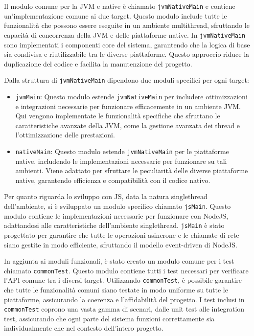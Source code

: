 \documentclass[12pt,a4paper,openright,twoside]{book}
\begin{document}
Il modulo comune per la \ac{JVM} e native è chiamato \texttt{jvmNativeMain} e contiene 
un'implementazione comune ai due target. Questo modulo include tutte le funzionalità che possono essere eseguite in un ambiente multithread, 
sfruttando le capacità di concorrenza della \ac{JVM} e delle piattaforme native. In \texttt{jvmNativeMain} sono implementati i componenti core del sistema, 
garantendo che la logica di base sia condivisa e riutilizzabile tra le diverse piattaforme. Questo approccio riduce la duplicazione 
del codice e facilita la manutenzione del progetto.

Dalla struttura di \texttt{jvmNativeMain} dipendono due moduli specifici per ogni target:
\begin{itemize}
    \item \texttt{jvmMain}: Questo modulo estende \texttt{jvmNativeMain} per includere ottimizzazioni e integrazioni necessarie per funzionare efficacemente in un ambiente \ac{JVM}. Qui vengono implementate le funzionalità specifiche che sfruttano le caratteristiche avanzate della \ac{JVM}, come la gestione avanzata dei thread e l'ottimizzazione delle prestazioni.
    \item \texttt{nativeMain}: Questo modulo estende \texttt{jvmNativeMain} per le piattaforme native, includendo le implementazioni necessarie per funzionare su tali ambienti. Viene adattato per sfruttare le peculiarità delle diverse piattaforme native, garantendo efficienza e compatibilità con il codice nativo.
\end{itemize}

Per quanto riguarda lo sviluppo con \ac{JS}, data la natura singlethread dell'ambiente, si è sviluppato un modulo specifico chiamato \texttt{jsMain}. 
Questo modulo contiene le implementazioni necessarie per funzionare con NodeJS, adattandosi alle caratteristiche dell'ambiente singlethread. \texttt{jsMain} è stato progettato 
per garantire che tutte le operazioni asincrone e le chiamate di rete siano gestite in modo efficiente, sfruttando il modello event-driven di NodeJS.

In aggiunta ai moduli funzionali, è stato creato un modulo comune per i test chiamato \texttt{commonTest}. Questo modulo contiene tutti i test necessari per verificare 
l'API comune tra i diversi target. Utilizzando \texttt{commonTest}, è possibile garantire che tutte le funzionalità comuni siano testate in modo uniforme su tutte le piattaforme, 
assicurando la coerenza e l'affidabilità del progetto. I test inclusi in \texttt{commonTest} coprono una vasta gamma di scenari, dalle unit test alle integration test, assicurando che 
ogni parte del sistema funzioni correttamente sia individualmente che nel contesto dell'intero progetto.
\end{document}
